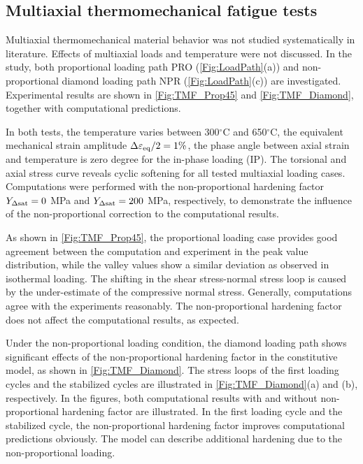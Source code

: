 \subsection{Multiaxial thermomechanical fatigue tests}
\noindent
Multiaxial thermomechanical material behavior was not studied systematically in literature. Effects of multiaxial loads and temperature were not discussed. In the study, both proportional loading path PRO (\ref{Fig:LoadPath}(a)) and non-proportional diamond loading path NPR (\ref{Fig:LoadPath}(c)) are investigated. Experimental results are shown in \ref{Fig:TMF_Prop45} and \ref{Fig:TMF_Diamond}, together with computational predictions.

In both tests, the temperature varies between 300$^\circ$C and 650$^\circ$C, the equivalent mechanical strain amplitude $\Delta\varepsilon_{\rm{eq}}/2=1\%$, the phase angle between axial strain and temperature is zero degree for the in-phase loading (IP).
The torsional and axial stress curve reveals cyclic softening for all tested multiaxial loading cases.
Computations were performed with the non-proportional hardening factor $Y_{\Delta {\rm{sat}}}=0$ MPa and $Y_{\Delta {\rm{sat}}}=200$ MPa, respectively, to demonstrate the influence of the non-proportional correction to the computational results.

As shown in \ref{Fig:TMF_Prop45}, the proportional loading case provides good agreement between the computation and experiment in the peak value distribution, while the valley values show a similar deviation as observed in isothermal loading. The shifting in the shear stress-normal stress loop is caused by the under-estimate of the compressive normal stress. Generally, computations agree with the experiments reasonably. The non-proportional hardening factor does not affect the computational results, as expected.

Under the non-proportional loading condition, the diamond loading path shows significant effects of the non-proportional hardening factor in the constitutive model, as shown in \ref{Fig:TMF_Diamond}. The stress loops of the first loading cycles and the stabilized cycles are illustrated in \ref{Fig:TMF_Diamond}(a) and (b), respectively. In the figures, both computational results with and without non-proportional hardening factor are illustrated. In the first loading cycle and the stabilized cycle, the non-proportional hardening factor improves computational predictions obviously. The model can describe additional hardening due to the non-proportional loading.

